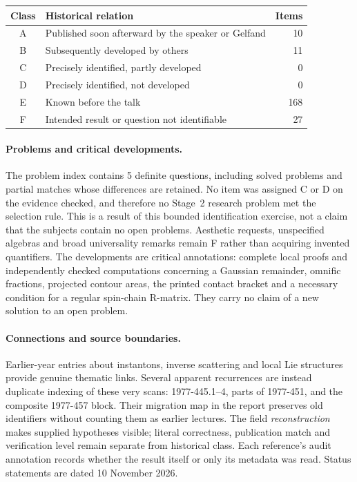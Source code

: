 \begin{center}
\begin{tabular}{cl r}
\toprule
Class & Historical relation & Items\\
\midrule
A & Published soon afterward by the speaker or Gelfand & 10\\
B & Subsequently developed by others & 11\\
C & Precisely identified, partly developed & 0\\
D & Precisely identified, not developed & 0\\
E & Known before the talk & 168\\
F & Intended result or question not identifiable & 27\\
\bottomrule
\end{tabular}
\end{center}

\paragraph{Problems and critical developments.}
The problem index contains 5 definite questions, including solved
problems and partial matches whose differences are retained. No item was
assigned C or D on the evidence checked, and therefore no Stage~2 research
problem met the selection rule. This is a result of this bounded
identification exercise, not a claim that the subjects contain no open
problems. Aesthetic requests, unspecified algebras and broad universality
remarks remain F rather than acquiring invented quantifiers.
The developments are critical annotations: complete local proofs and
independently checked computations concerning a Gaussian remainder,
omnific fractions, projected contour areas, the printed contact bracket
and a necessary condition for a regular spin-chain R-matrix. They carry
no claim of a new solution to an open problem.

\paragraph{Connections and source boundaries.}
Earlier-year entries about instantons, inverse scattering and local Lie
structures provide genuine thematic links. Several apparent recurrences
are instead duplicate indexing of these very scans: 1977-445.1--4,
parts of 1977-451, and the composite 1977-457 block. Their migration map
in the report preserves old identifiers without counting them as earlier
lectures. The field \emph{reconstruction} makes supplied hypotheses
visible; literal correctness, publication match and verification level
remain separate from historical class. Each reference's audit annotation
records whether the result itself or only its metadata was read. Status
statements are dated 10 November 2026.
